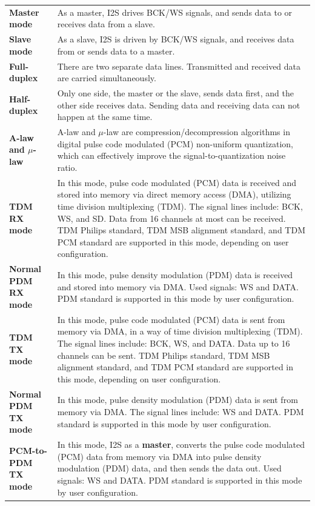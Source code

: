 \documentclass[main\_\_EN.tex]{subfiles}
\begin{document}
\begin{longtable}[c]{ R{4cm} p{10cm} }
\textbf{Master mode}     & As a master, I2S drives BCK/WS signals, and sends data to or receives data from a slave. \\ 
\textbf{Slave mode}      & As a slave, I2S is driven by BCK/WS signals, and receives data from or sends data to a master. \\
\textbf{Full-duplex} & There are two separate data lines. Transmitted and received data are carried simultaneously.\\
\textbf{Half-duplex} & Only one side, the master or the slave, sends data first, and the other side receives data. Sending data and receiving data can not happen at the same time.\\
\textbf{A-law and $\mu$-law} & A-law and \textrm{$\mu$}-law are compression/decompression algorithms in digital pulse code modulated (PCM) non-uniform quantization, which can effectively improve the signal-to-quantization noise ratio. \\
\textbf{TDM RX mode} & In this mode, pulse code modulated (PCM) data is received and stored into memory via direct memory access (DMA), utilizing time division multiplexing (TDM). The signal lines include: BCK, WS, and SD. Data from 16 channels at most can be received. TDM Philips standard, TDM MSB alignment standard, and TDM PCM standard are supported in this mode, depending on user configuration.\\
\textbf{Normal PDM RX mode} & In this mode, pulse density modulation (PDM) data is received and stored into memory via DMA. Used signals: WS and DATA. PDM standard is supported in this mode by user configuration.\\
\textbf{TDM TX mode} & In this mode, pulse code modulated (PCM) data is sent from memory via DMA, in a way of time division multiplexing (TDM). The signal lines include: BCK, WS, and DATA. Data up to 16 channels can be sent. TDM Philips standard, TDM MSB alignment standard, and TDM PCM standard are supported in this mode, depending on user configuration.\\
\textbf{Normal PDM TX mode} & In this mode, pulse density modulation (PDM) data is sent from memory via DMA. The signal lines include: WS and DATA. PDM standard is supported in this mode by user configuration.\\
\textbf{PCM-to-PDM TX mode} & In this mode, I2S as a \textbf{master}, converts the pulse code modulated (PCM) data from memory via DMA into pulse density modulation (PDM) data, and then sends the data out. Used signals: WS and DATA. PDM standard is supported in this mode by user configuration.\\
\end{longtable}
\end{document}
